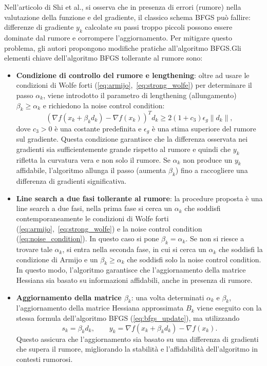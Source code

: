 Nell'articolo di Shi et al.\cite{shi2022noise}, si osserva che in presenza di errori (rumore) nella valutazione della funzione e del gradiente, il classico schema BFGS può fallire: differenze di gradiente \(y_k\) calcolate su passi troppo piccoli possono essere dominate dal rumore e corrompere l’aggiornamento. Per mitigare questo problema, gli autori propongono modifiche pratiche all'algoritmo BFGS.\@ Gli elementi chiave dell'algoritmo BFGS tollerante al rumore sono:
\begin{itemize}

    \item \textbf{Condizione di controllo del rumore e lengthening}: oltre ad usare le condizioni di Wolfe forti (\ref{eq:armijo},~\ref{eq:strong_wolfe}) per determinare il passo \( \alpha_k \), viene introdotto il parametro di lengthening (allungamento) \( \beta_k \geq \alpha_k \) e richiedono la noise control condition:
    \begin{equation}\label{eq:noise_condition}
        {(\nabla f(x_k + \beta_k d_k) - \nabla f(x_k))}^T d_k \geq 2(1 + c_3) \epsilon_g \|d_k\|,
    \end{equation}
    dove \( c_3 > 0 \) è una costante predefinita e \( \epsilon_g \) è una stima superiore del rumore sul gradiente. Questa condizione garantisce che la differenza osservata nei gradienti sia sufficientemente grande rispetto al rumore e quindi che \(y_k\) rifletta la curvatura vera e non solo il rumore. Se \( \alpha_k \) non produce un \(y_k\) affidabile, l’algoritmo allunga il passo (aumenta \( \beta_k \)) fino a raccogliere una differenza di gradienti significativa.

    \item \textbf{Line search a due fasi tollerante al rumore}: la procedure proposta è una line search a due fasi, nella prima fase si cerca un \( \alpha_k \) che soddisfi contemporaneamente le condizioni di Wolfe forti (\ref{eq:armijo},~\ref{eq:strong_wolfe}) e la noise control condition (\ref{eq:noise_condition}). In questo caso si pone \( \beta_k = \alpha_k \). Se non si riesce a trovare tale \( \alpha_k \), si entra nella seconda fase, in cui si cerca un \( \alpha_k \) che soddisfi la condizione di Armijo e un \( \beta_k \geq \alpha_k \) che soddisfi solo la noise control condition. In questo modo, l'algoritmo garantisce che l'aggiornamento della matrice Hessiana sia basato su informazioni affidabili, anche in presenza di rumore. 
    
    \item \textbf{Aggiornamento della matrice \( \beta_k \)}: una volta determinati \( \alpha_k \) e \( \beta_k \), l'aggiornamento della matrice Hessiana approssimata \( B_k \) viene eseguito con la stessa formula dell'algoritmo BFGS (\ref{eq:bfgs_update}), ma utilizzando 
    \[
        s_k = \beta_k d_k,\qquad y_k = \nabla f(x_k + \beta_k d_k) - \nabla f(x_k).
    \]
    Questo assicura che l'aggiornamento sia basato su una differenza di gradienti che supera il rumore, migliorando la stabilità e l'affidabilità dell'algoritmo in contesti rumorosi.
    
\end{itemize}

